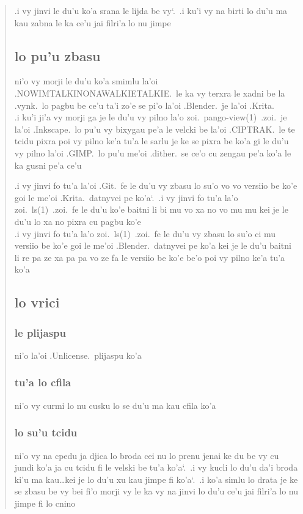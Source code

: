 \documentclass{report}
\newcommand\sds{\spacefactor\sfcode`.\ \space}
\begin{document}
\begin{quote}
		.i vy jinvi le du'u ko'a srana le lijda be vy\sds  .i ku'i vy na birti lo du'u ma kau zabna le ka ce'u jai filri'a lo nu jimpe

	\subsection{lo pu'u zbasu}
		ni'o vy morji le du'u ko'a smimlu la'oi .NOWIMTALKINONAWALKIETALKIE.\ le ka vy terxra le xadni be la .vynk.\ lo pagbu be ce'u ta'i zo'e se pi'o la'oi .Blender.\ je la'oi .Krita.\\
		.i ku'i ji'a vy morji ga je le du'u vy pilno la'o zoi.\ pango-view(1)\ .zoi.\ je la'oi .Inkscape.\ lo pu'u vy bixygau pe'a le velcki be la'oi .CIPTRAK.\ le te tcidu pixra poi vy pilno ke'a tu'a le sarlu je ke se pixra be ko'a gi le du'u vy pilno la'oi .GIMP.\ lo pu'u me'oi .dither.\ se ce'o cu zengau pe'a ko'a le ka gusni pe'a ce'u

		.i vy jinvi fo tu'a la'oi .Git.\ fe le du'u vy zbasu lo su'o vo vo versiio be ko'e goi le me'oi .Krita.\ datnyvei pe ko'a\sds  .i vy jinvi fo tu'a la'o zoi.\ ls(1)\ .zoi.\ fe le du'u ko'e baitni li bi mu vo xa no vo mu mu kei je le du'u lo xa no pixra cu pagbu ko'e \\
		.i vy jinvi fo tu'a la'o zoi.\ ls(1)\ .zoi.\ fe le du'u vy zbasu lo su'o ci mu versiio be ko'e goi le me'oi .Blender.\ datnyvei pe ko'a kei je le du'u baitni li re pa ze xa pa pa vo ze fa le versiio be ko'e be'o poi vy pilno ke'a tu'a ko'a

	\subsection{lo vrici}
		\subsubsection{le plijaspu}
			ni'o la'oi .Unlicense.\ plijaspu ko'a
		\subsubsection{tu'a lo cfila}
			ni'o vy curmi lo nu cusku lo se du'u ma kau cfila ko'a
		\subsubsection{lo su'u tcidu}
			ni'o vy na cpedu ja djica lo broda cei nu lo prenu jenai ke du be vy cu jundi ko'a ja cu tcidu fi le velski be tu'a ko'a\sds  .i vy kucli lo du'u da'i broda ki'u ma kau\ldots kei je lo du'u xu kau jimpe fi ko'a\sds  .i ko'a simlu lo drata je ke se zbasu be vy bei fi'o morji vy le ka vy na jinvi lo du'u ce'u jai filri'a lo nu jimpe fi lo cnino
\end{quote}
\end{document}
